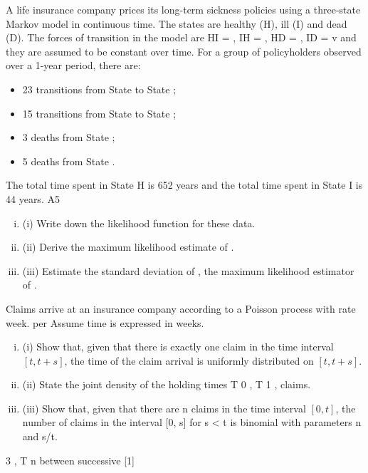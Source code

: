 \documentclass[a4paper,12pt]{article}
\begin{document}
\begin{enumerate}

A life insurance company prices its long-term sickness policies using a three-state
Markov model in continuous time. The states are healthy (H), ill (I) and dead (D). The
forces of transition in the model are HI = , IH = , HD = , ID = v and they are
assumed to be constant over time.
For a group of policyholders observed over a 1-year period, there are:
\begin{itemize}
\item 23 transitions from State to State ;
\item 15 transitions from State to State ;
\item 3 deaths from State ;
\item 5 deaths from State .
\end{itemize}
The total time spent in State H is 652 years and the total time spent in State I is 44
years.
A5
\begin{enumerate}[(i)]
\item (i) Write down the likelihood function for these data. 
\item (ii) Derive the maximum likelihood estimate of . 
\item (iii) Estimate the standard deviation of
, the maximum likelihood estimator of .
\end{enumerate}

Claims arrive at an insurance company according to a Poisson process with rate
week.
per
Assume time is expressed in weeks.
\begin{enumerate}[(i)]
\item (i) Show that, given that there is exactly one claim in the time interval $[t, t + s]$,
the time of the claim arrival is uniformly distributed on $[t, t + s]$.

\item (ii) State the joint density of the holding times T 0 , T 1 ,
claims.
\item (iii) Show that, given that there are n claims in the time interval $[0, t]$, the number
of claims in the interval [0, s] for s < t is binomial with parameters n and s/t.
\end{enumerate}
3
, T n between successive
[1]




\end{enumerate}
\end{document}
